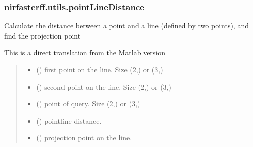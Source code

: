 \documentclass[letterpaper,10pt,english]{sphinxmanual}
\begin{document}
\sphinxstepscope


\subsubsection{nirfasterff.utils.pointLineDistance}
\label{\detokenize{_autosummary/nirfasterff.utils.pointLineDistance:nirfasterff-utils-pointlinedistance}}\label{\detokenize{_autosummary/nirfasterff.utils.pointLineDistance::doc}}

\begin{fulllineitems}
\label{\detokenize{_autosummary/nirfasterff.utils.pointLineDistance:nirfasterff.utils.pointLineDistance}}
\pysigstartsignatures
\pysiglinewithargsret
{}
{\sphinxparamcomma {}\sphinxparamcomma {}}
{}
\pysigstopsignatures
\sphinxAtStartPar
Calculate the distance between a point and a line (defined by two points), and find the projection point

\sphinxAtStartPar
This is a direct translation  from the Matlab version
\begin{quote}\begin{description}
\begin{itemize}
\item {} 
\sphinxAtStartPar
{} () \textendash{} first point on the line. Size (2,) or (3,)

\item {} 
\sphinxAtStartPar
{} () \textendash{} second point on the line. Size (2,) or (3,)

\item {} 
\sphinxAtStartPar
{} () \textendash{} point of query. Size (2,) or (3,)

\end{itemize}

\sphinxAtStartPar
\begin{itemize}
\item {} 
\sphinxAtStartPar
{} () \textendash{} point\sphinxhyphen{}line distance.

\item {} 
\sphinxAtStartPar
{} () \textendash{} projection point on the line.

\end{itemize}


\end{description}\end{quote}

\end{fulllineitems}
\end{document}
